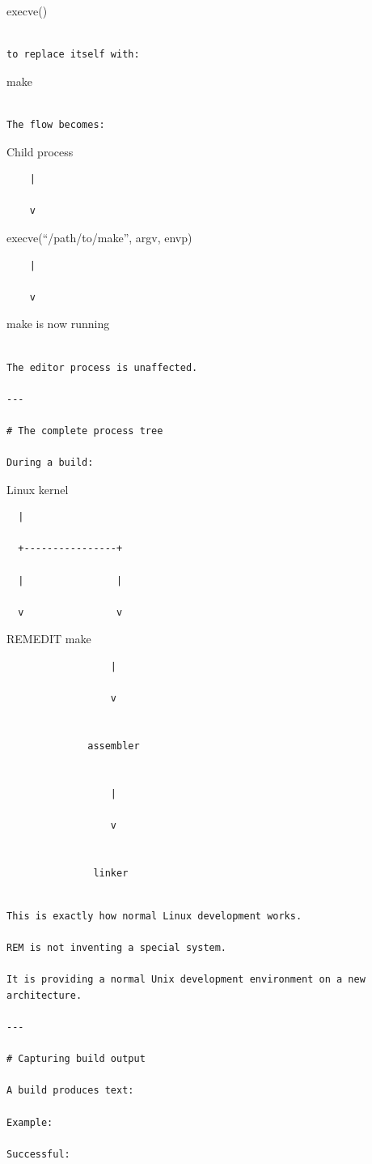 \documentclass[
  oneside,
  openany]{book}
\begin{document}
execve()

\begin{verbatim}

to replace itself with:
\end{verbatim}

make

\begin{verbatim}

The flow becomes:
\end{verbatim}

Child process

\begin{verbatim}
    |

    v
\end{verbatim}

execve(``/path/to/make'', argv, envp)

\begin{verbatim}
    |

    v
\end{verbatim}

make is now running

\begin{verbatim}

The editor process is unaffected.

---

# The complete process tree

During a build:
\end{verbatim}

Linux kernel

\begin{verbatim}
  |

  +----------------+

  |                |

  v                v
\end{verbatim}

REMEDIT make

\begin{verbatim}
                  |

                  v


              assembler


                  |

                  v


               linker
\end{verbatim}

\begin{verbatim}

This is exactly how normal Linux development works.

REM is not inventing a special system.

It is providing a normal Unix development environment on a new architecture.

---

# Capturing build output

A build produces text:

Example:

Successful:
\end{verbatim}
\end{document}
